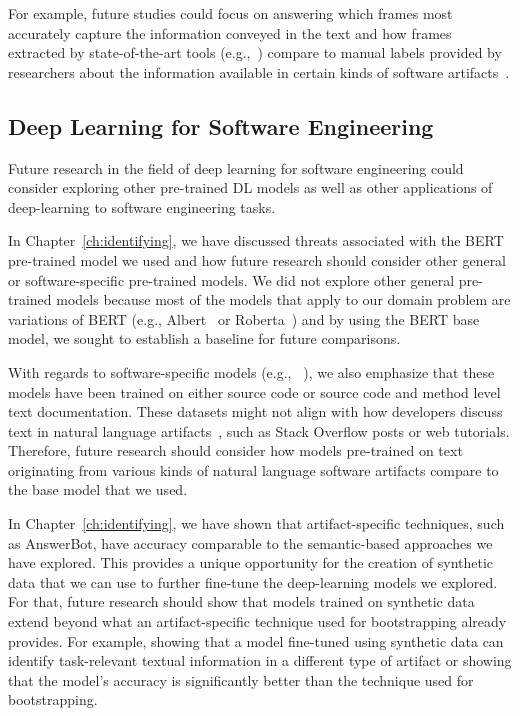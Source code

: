 For example, future studies could focus on answering 
which frames most accurately capture the information conveyed in the text 
and how frames extracted by state-of-the-art tools (e.g.,~\cite{swayamdipta17, chen2021joint})
compare to manual labels provided by researchers 
about the information available in certain kinds of software artifacts~\cite{Maalej2013, Arya2019, Sorbo2015}.  



 






\subsection{Deep Learning for Software Engineering}
\label{cp7:deep-learning}



Future research in the field of deep learning for software engineering could consider 
exploring other pre-trained \acs{DL} models as well as other applications of 
deep-learning to software engineering tasks. 




In Chapter~\ref{ch:identifying}, we have discussed threats associated with the BERT pre-trained model 
we used and how future research should consider other 
general or software-specific pre-trained models.
We did not explore other general pre-trained models because most of the models that apply to our domain problem 
are variations of BERT (e.g., Albert~\cite{lan2019albert} or Roberta~\cite{liu2019roberta})
and by using the BERT base model, we sought to establish a baseline for future comparisons.




With regards to software-specific models (e.g., ~\cite{feng2020-codebert, li2019neural}), we also emphasize 
that these models have been trained on either source code or source code and method level text documentation. 
These datasets might not align with how developers discuss text in natural language artifacts~\cite{arya2020}, such 
as Stack Overflow posts or web tutorials. Therefore, future research should consider how 
 models pre-trained on text originating from various kinds of 
natural language software artifacts compare to the base model that we used.





In Chapter~\ref{ch:identifying}, we have shown that artifact-specific techniques, such as AnswerBot, have accuracy comparable to the semantic-based approaches
we have explored. This  provides
a unique opportunity for the creation of synthetic data that we can use to further fine-tune the deep-learning models we explored.
For that, future research should show that models trained on synthetic data
 extend beyond what an artifact-specific technique used for bootstrapping already provides. For example, showing that
a model fine-tuned using synthetic data can identify task-relevant textual information in a different type of artifact or showing
that the model's accuracy is significantly better than the technique used for bootstrapping.



